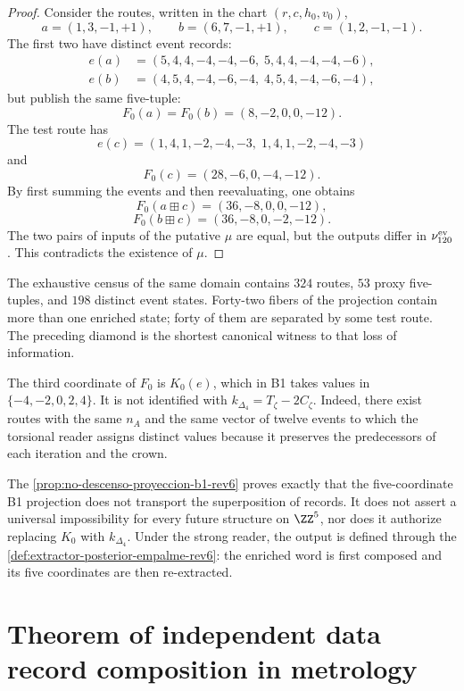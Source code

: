 \begin{proof}
Consider the routes, written in the chart
\((r,c,h_0,v_0)\),
\[
 a=(1,3,-1,+1),
 \qquad
 b=(6,7,-1,+1),
 \qquad
 c=(1,2,-1,-1).
\]
The first two have distinct event records:
\[
\begin{aligned}
 e(a)&=(5,4,4,-4,-4,-6,\;5,4,4,-4,-4,-6),\\
 e(b)&=(4,5,4,-4,-6,-4,\;4,5,4,-4,-6,-4),
\end{aligned}
\]
but publish the same five-tuple:
\[
 F_0(a)=F_0(b)=(8,-2,0,0,-12).
\]
The test route has
\[
 e(c)=(1,4,1,-2,-4,-3,\;1,4,1,-2,-4,-3)
\]
and
\[
 F_0(c)=(28,-6,0,-4,-12).
\]
By first summing the events and then reevaluating, one obtains
\[
 F_0(a\boxplus c)=(36,-8,0,0,-12),
\]
\[
 F_0(b\boxplus c)=(36,-8,0,-2,-12).
\]
The two pairs of inputs of the putative \(\mu\) are equal, but the
outputs differ in \(\nu_{120}^{\rm ev}\). This contradicts the existence of
\(\mu\).
\end{proof}

The exhaustive census of the same domain contains \(324\) routes, \(53\)
proxy five-tuples, and \(198\) distinct event states. Forty-two
fibers of the projection contain more than one enriched state; forty of
them are separated by some test route. The preceding diamond is the shortest
canonical witness to that loss of information.

\begin{remark}
\label{rem:proxy-no-torsion-fuerte-rev6}
The third coordinate of \(F_0\) is \(K_0(e)\), which in B1 takes values in
\(\{-4,-2,0,2,4\}\). It is not identified with
\(k_{\Delta_4}=T_\zeta-2C_\zeta\). Indeed, there exist routes with the same
\(n_A\) and the same vector of twelve events to which the torsional reader
assigns distinct values because it preserves the predecessors of each iteration
and the crown.

The \cref{prop:no-descenso-proyeccion-b1-rev6} proves exactly that the
five-coordinate B1 projection does not transport the superposition of
records. It does not assert a universal impossibility for every future structure
on \(\ZZ^5\), nor does it authorize replacing \(K_0\) with
\(k_{\Delta_4}\). Under the strong reader, the output is defined through the
\cref{def:extractor-posterior-empalme-rev6}: the enriched word is first
composed and its five coordinates are then re-extracted.
\end{remark}

\section{Theorem of independent data record composition in metrology}
\label{sec:teorema-composicional-sin-blancos-rev6}

